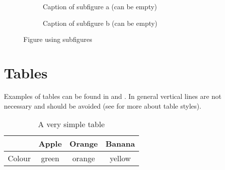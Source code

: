 \begin{figure}[!h]
	\centering
	\begin{subfigure}[b]{7cm}
	  \centering
    \fbox{\parbox{5cm}{\centering ~\vspace{1.5cm}\\Dummy\\~\vspace{1.5cm}}} %
		\caption{Caption of subfigure a (can be empty)}
		\label{fig:subfigure1}
	\end{subfigure}
	\begin{subfigure}[b]{7cm}
    \centering
    \fbox{\parbox{5cm}{\centering ~\vspace{1.5cm}\\Dummy\\~\vspace{1.5cm}}} %
		\caption{Caption of subfigure b (can be empty)}
		\label{fig:subfigure2}
	\end{subfigure}
\caption{Figure using subfigures}
\label{fig:figure_with_subfigures}
\end{figure}


\section{Tables}

Examples of tables can be found in  and . In general vertical lines are not necessary and should be avoided (see \cite{Fear05} for more about table styles).

\begin{table}[!h]
	\renewcommand{\arraystretch}{1.1}
	\caption{A very simple table}
	\label{tab:simple_table}
	\centering
	\begin{tabular}{cccc}
	  \toprule
	               & Apple & Orange & Banana \\
		\midrule
	  Colour       & green & orange & yellow\\
	  \bottomrule
	\end{tabular}
\end{table}

